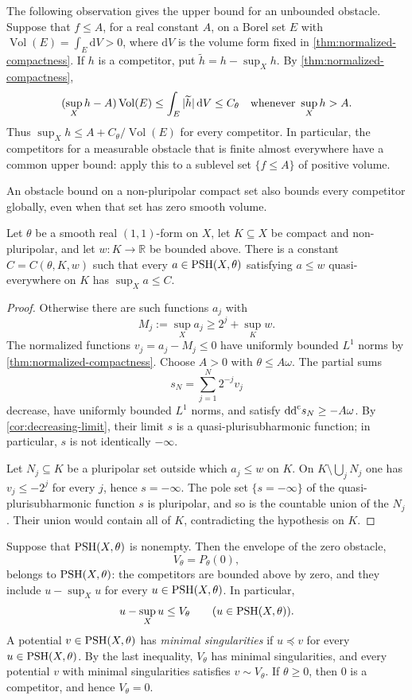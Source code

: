 The following observation gives the upper bound for an unbounded obstacle. Suppose that $f\leq A$, for a real constant $A$, on a Borel set $E$ with $\operatorname{Vol}(E)=\int_E\mathrm{d}V>0$, where $\mathrm{d}V$ is the volume form fixed in \cref{thm:normalized-compactness}. If $h$ is a competitor, put $\widetilde h=h-\sup_Xh$. By \cref{thm:normalized-compactness},
\[
 (\sup_Xh-A)\operatorname{Vol}(E)
 \leq\int_E|\widetilde h|\,\mathrm{d}V\leq C_\theta
 \quad\hbox{whenever }\sup_Xh>A.
\]
Thus $\sup_Xh\leq A+C_\theta/\operatorname{Vol}(E)$ for every competitor. In particular, the competitors for a measurable obstacle that is finite almost everywhere have a common upper bound: apply this to a sublevel set $\{f\leq A\}$ of positive volume.

An obstacle bound on a non-pluripolar compact set also bounds every competitor globally, even when that set has zero smooth volume.

\begin{lemma}\label{lem:compact-obstacle-upper-bound}
Let $\theta$ be a smooth real $(1,1)$-form on $X$, let $K\subseteq X$ be compact and non-pluripolar, and let $w\colon K\to\mathbb R$ be bounded above. There is a constant $C=C(\theta,K,w)$ such that every $a\in\mathrm{PSH}(X,\theta)$ satisfying $a\leq w$ quasi-everywhere on $K$ has $\sup_X a\leq C$.
\end{lemma}
\begin{proof}
Otherwise there are such functions $a_j$ with
\[
 M_j:=\sup_Xa_j\geq 2^j+\sup_Kw.
\]
The normalized functions $v_j=a_j-M_j\leq0$ have uniformly bounded $L^1$ norms by \cref{thm:normalized-compactness}. Choose $A>0$ with $\theta\leq A\omega$. The partial sums
\[
 s_N=\sum_{j=1}^N2^{-j}v_j
\]
decrease, have uniformly bounded $L^1$ norms, and satisfy $\mathrm{dd}^{\mathrm{c}} s_N\geq-A\omega$. By \cref{cor:decreasing-limit}, their limit $s$ is a quasi-plurisubharmonic function; in particular, $s$ is not identically $-\infty$.

Let $N_j\subseteq K$ be a pluripolar set outside which $a_j\leq w$ on $K$. On $K\setminus\bigcup_jN_j$ one has $v_j\leq-2^j$ for every $j$, hence $s=-\infty$. The pole set $\{s=-\infty\}$ of the quasi-plurisubharmonic function $s$ is pluripolar, and so is the countable union of the $N_j$. Their union would contain all of $K$, contradicting the hypothesis on $K$.
\end{proof}

Suppose that $\mathrm{PSH}(X,\theta)$ is nonempty. Then the envelope of the zero obstacle,
\[
 V_\theta=P_\theta(0),
\]
belongs to $\mathrm{PSH}(X,\theta)$: the competitors are bounded above by zero, and they include $u-\sup_Xu$ for every $u\in\mathrm{PSH}(X,\theta)$. In particular,
\[
 u-\sup_Xu\leq V_\theta\qquad(u\in\mathrm{PSH}(X,\theta)).
\]
A potential $v\in\mathrm{PSH}(X,\theta)$ has \emph{minimal singularities} if $u\preceq v$ for every $u\in\mathrm{PSH}(X,\theta)$. By the last inequality, $V_\theta$ has minimal singularities, and every potential $v$ with minimal singularities satisfies $v\sim V_\theta$. If $\theta\geq0$, then $0$ is a competitor, and hence $V_\theta=0$.

